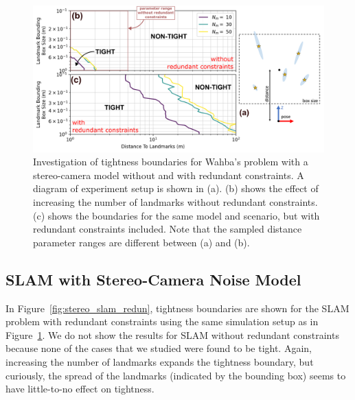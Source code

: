 \documentclass[lettersize,journal]{IEEEtran}
\begin{document}
\begin{figure}[!t]
	\centering
	\includegraphics[width=\columnwidth]{figs/stereo_redun_study}
	\caption{Investigation of tightness boundaries for Wahba's problem with a stereo-camera model without and with redundant constraints. A diagram of experiment setup is shown in (a). (b) shows the effect of increasing the number of landmarks without redundant constraints. (c) shows the boundaries for the same model and scenario, but with redundant constraints included. Note that the sampled distance parameter ranges are different between (a) and (b).}
	\label{fig:stereo_redun}
\end{figure}

\subsection{SLAM with Stereo-Camera Noise Model}\label{sec:SimStereoSLAM}

In Figure~\ref{fig:stereo_slam_redun}, tightness boundaries are shown for the SLAM problem with redundant constraints using the same simulation setup as in Figure~\ref{fig:stereo_redun}. We do not show the results for SLAM without redundant constraints because none of the cases that we studied were found to be tight. Again, increasing the number of landmarks expands the tightness boundary, but curiously, the spread of the landmarks (indicated by the bounding box) seems to have little-to-no effect on tightness.
\end{document}
